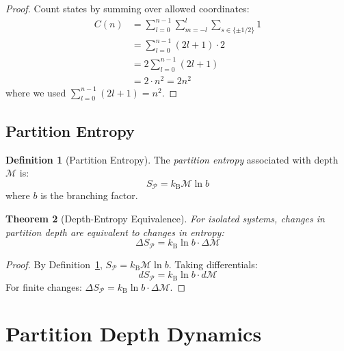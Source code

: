 \documentclass[twocolumn,10pt,a4paper]{article}
\newtheorem{theorem}{Theorem}[section]
\theoremstyle{definition}
\newtheorem{definition}[theorem]{Definition}
\theoremstyle{remark}
\newcommand{\kB}{k_{\mathrm{B}}}
\newcommand{\Partition}{\mathcal{P}}
\newcommand{\Depth}{\mathcal{M}}
\begin{document}
\begin{proof}
Count states by summing over allowed coordinates:
\begin{align}
    C(n) &= \sum_{l=0}^{n-1} \sum_{m=-l}^{l} \sum_{s \in \{\pm 1/2\}} 1 \\
    &= \sum_{l=0}^{n-1} (2l+1) \cdot 2 \\
    &= 2 \sum_{l=0}^{n-1} (2l+1) \\
    &= 2 \cdot n^2 = 2n^2
\end{align}
where we used $\sum_{l=0}^{n-1}(2l+1) = n^2$.
\end{proof}

\subsection{Partition Entropy}

\begin{definition}[Partition Entropy]
\label{def:partition_entropy}
The \emph{partition entropy} associated with depth $\Depth$ is:
\begin{equation}
    S_{\Partition} = \kB \Depth \ln b
\end{equation}
where $b$ is the branching factor.
\end{definition}

\begin{theorem}[Depth-Entropy Equivalence]
\label{thm:entropy_equiv}
For isolated systems, changes in partition depth are equivalent to changes in entropy:
\begin{equation}
    \Delta S_{\Partition} = \kB \ln b \cdot \Delta\Depth
\end{equation}
\end{theorem}

\begin{proof}
By Definition~\ref{def:partition_entropy}, $S_{\Partition} = \kB \Depth \ln b$. Taking differentials:
\begin{equation}
    dS_{\Partition} = \kB \ln b \cdot d\Depth
\end{equation}
For finite changes: $\Delta S_{\Partition} = \kB \ln b \cdot \Delta\Depth$.
\end{proof}

\section{Partition Depth Dynamics}
\label{sec:partition_depth}
\end{document}
